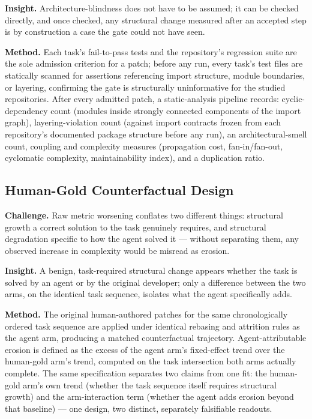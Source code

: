 \documentclass[11pt]{article}
\begin{document}
\textbf{Insight.} Architecture-blindness does not have to be assumed; it can be checked directly, and once checked, any structural change measured after an accepted step is by construction a case the gate could not have seen.

\textbf{Method.} Each task's fail-to-pass tests and the repository's regression suite are the sole admission criterion for a patch; before any run, every task's test files are statically scanned for assertions referencing import structure, module boundaries, or layering, confirming the gate is structurally uninformative for the studied repositories. After every admitted patch, a static-analysis pipeline records: cyclic-dependency count (modules inside strongly connected components of the import graph), layering-violation count (against import contracts frozen from each repository's documented package structure before any run), an architectural-smell count, coupling and complexity measures (propagation cost, fan-in/fan-out, cyclomatic complexity, maintainability index), and a duplication ratio.

\subsection{Human-Gold Counterfactual Design}
\textbf{Challenge.} Raw metric worsening conflates two different things: structural growth a correct solution to the task genuinely requires, and structural degradation specific to how the agent solved it --- without separating them, any observed increase in complexity would be misread as erosion.

\textbf{Insight.} A benign, task-required structural change appears whether the task is solved by an agent or by the original developer; only a difference between the two arms, on the identical task sequence, isolates what the agent specifically adds.

\textbf{Method.} The original human-authored patches for the same chronologically ordered task sequence are applied under identical rebasing and attrition rules as the agent arm, producing a matched counterfactual trajectory. Agent-attributable erosion is defined as the excess of the agent arm's fixed-effect trend over the human-gold arm's trend, computed on the task intersection both arms actually complete. The same specification separates two claims from one fit: the human-gold arm's own trend (whether the task sequence itself requires structural growth) and the arm-interaction term (whether the agent adds erosion beyond that baseline) --- one design, two distinct, separately falsifiable readouts.
\end{document}

